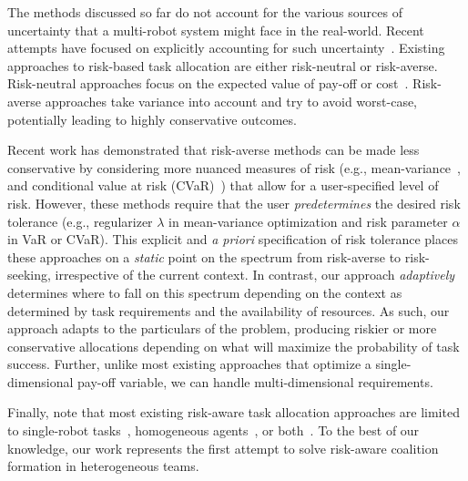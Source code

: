 \documentclass[letterpaper, 10 pt, conference]{ieeeconf}  %
\begin{document}

The methods discussed so far do not account for the various sources of uncertainty that a multi-robot system might face in the real-world. Recent attempts have focused on explicitly accounting for such uncertainty~\cite{zhou_multi-robot_2021}. Existing approaches to risk-based task allocation are either risk-neutral or risk-averse. Risk-neutral approaches focus on the expected value of pay-off or cost~\cite{prorok_redundant_2019,choudhury2020dynamic}. Risk-averse approaches take variance into account and try to avoid worst-case, potentially leading to highly conservative outcomes. 

Recent work has demonstrated that risk-averse methods can be made less conservative by considering more nuanced measures of risk (e.g., mean-variance~\cite{yang_algorithm_2018,ravichandar2020}, and conditional value at risk (CVaR)~\cite{nam_analyzing_2017,sharma2020risk}) that allow for a user-specified level of risk. However, these methods require that the user \textit{predetermines} the desired risk tolerance (e.g., regularizer $\lambda$ in mean-variance optimization and risk parameter $\alpha$ in VaR or CVaR). This explicit and \textit{a priori} specification of risk tolerance places these approaches on a \textit{static} point on the spectrum from risk-averse to risk-seeking, irrespective of the current context. In contrast, our approach \textit{adaptively} determines where to fall on this spectrum depending on the context as determined by task requirements and the availability of resources. As such, our approach adapts to the particulars of the problem, producing riskier or more conservative allocations depending on what will maximize the probability of task success. Further, unlike most existing approaches that optimize a single-dimensional pay-off variable, we can handle multi-dimensional requirements.


Finally, note that most existing risk-aware task allocation approaches are limited to single-robot tasks~\cite{nam_analyzing_2017,choudhury2020dynamic}, homogeneous agents~\cite{prorok_redundant_2019}, or both~\cite{yang_algorithm_2017,sharma2020risk}. To the best of our knowledge, our work represents the first attempt to solve risk-aware coalition formation in heterogeneous teams.
\end{document}
